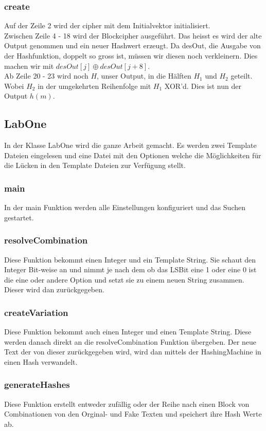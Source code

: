 \documentclass[12pt]{scrartcl}
\begin{document}
\subsubsection{create}

Auf der Zeile 2 wird der cipher mit dem Initialvektor initialisiert.\\
Zwischen Zeile 4 - 18 wird der Blockcipher ausgeführt. Das heisst es wird der alte Output genommen und ein neuer Hashwert erzeugt. Da desOut, die Ausgabe von der Hashfunktion, doppelt so gross ist, müssen wir diesen noch verkleinern. Dies machen wir mit $desOut[j] \oplus desOut[j + 8]$.\\
Ab Zeile 20 - 23 wird noch $H$, unser Output, in die Hälften $H_1$ und $H_2$ geteilt. Wobei $H_2$ in der umgekehrten Reihenfolge mit $H_1$ XOR'd. Dies ist nun der Output $h(m)$.
\subsection{LabOne}
In der Klasse LabOne wird die ganze Arbeit gemacht. Es werden zwei Template Dateien eingelesen und eine Datei mit den Optionen welche die Möglichkeiten für die Lücken in den Template Dateien zur Verfügung stellt.

\subsubsection{main}
In der main Funktion werden alle Einstellungen konfiguriert und das Suchen gestartet.

\subsubsection{resolveCombination}
Diese Funktion bekommt einen Integer und ein Template String. Sie schaut den Integer Bit-weise an und nimmt je nach dem ob das LSBit eine 1 oder eine 0 ist die eine oder andere Option und setzt sie zu einem neuen String zusammen. Dieser wird dan zurückgegeben.

\subsubsection{createVariation}
Diese Funktion bekommt auch einen Integer und einen Template String. Diese werden danach direkt an die resolveCombination Funktion übergeben. Der neue Text der von dieser zurückgegeben wird, wird dan mittels der HashingMachine in einen Hash verwandelt.

\subsubsection{generateHashes}
Diese Funktion erstellt entweder zufällig oder der Reihe nach einen Block von Combinationen von den Orginal- und Fake Texten und speichert ihre Hash Werte ab.

\end{document}
